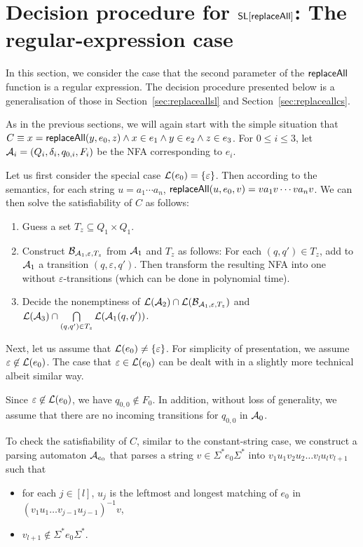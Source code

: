 
\section{Decision procedure for $\mathsf{SL}[\mathsf{replaceAll}]$: The regular-expression case} \label{sec:replaceallre}

In this section, we consider the case that the second parameter of the $\mathsf{replaceAll}$ function is a regular expression.  The decision procedure presented below is a generalisation of those in Section~\ref{sec:replaceallsl} and Section~\ref{sec:replaceallcs}. 

As in the previous sections, we will again start with the simple situation that $C \equiv x = \mathsf{replaceAll}(y, e_0, z) \wedge x \in e_1 \wedge y \in e_2 \wedge z \in e_3$. For $0\leq i\leq 3$, let $\mathcal{A}_i = (Q_i, \delta_i, q_{0,i}, F_i)$ be the NFA corresponding to $e_i$. 

Let us first consider the special case $\mathcal{L}(e_0)= \{\varepsilon\}$. Then according to the semantics, for each string $u = a_1 \cdots a_n$, $\mathsf{replaceAll}(u, e_0, v) = v a_1 v \cdots v a_n v$. We  can then solve the satisfiability of $C$ as follows: 
\begin{enumerate}
\item Guess a set $T_z \subseteq Q_1 \times Q_1$. 
%
\item Construct $\mathcal{B}_{\mathcal{A}_1, \varepsilon, T_z}$ from $\mathcal{A}_1$ and $T_z$ as follows: For each $(q,q') \in T_z$, add to $\mathcal{A}_1$ a transition $(q, \varepsilon, q')$. Then transform the resulting NFA into one without $\varepsilon$-transitions (which can be done in polynomial time).
%
\item  Decide the nonemptiness of $\mathcal{L}(\mathcal{A}_2) \cap \mathcal{L}(\mathcal{B}_{\mathcal{A}_1, \varepsilon, T_z})$ and $\mathcal{L}(\mathcal{A}_3) \cap \bigcap \limits_{(q,q') \in T_z} \mathcal{L}(\mathcal{A}_1(q,q'))$.
\end{enumerate}

Next, let us assume that $\mathcal{L}(e_0) \neq \{\varepsilon\}$. For simplicity of presentation, 
we assume $\varepsilon \not \in \mathcal{L}(e_0)$. The case that $\varepsilon \in \mathcal{L}(e_0)$ can be dealt with in a slightly more technical albeit similar way.

Since $\varepsilon \not \in \mathcal{L}(e_0)$, we have $q_{0,0} \not \in F_0$. In addition, without loss of generality, we assume that there are no incoming transitions for $q_{0,0}$ in $\mathcal{A}_0$.

To check the satisfiability of $C$, similar to the constant-string case, we construct a parsing automaton $\mathcal{A}_{e_0}$ that parses a string $v \in \Sigma^\ast e_0 \Sigma^\ast$ into $v_1 u_1 v_2 u_2 \dots v_l u_l v_{l+1}$ such that 
\begin{itemize}
	\item for each $j \in [l]$, $u_j$ is the leftmost and longest matching of $e_0$ in $(v_1 u_1 \dots v_{j-1} u_{j-1})^{-1} v$,
	\item $v_{l+1} \not \in \Sigma^\ast e_0 \Sigma^\ast$.
\end{itemize}


